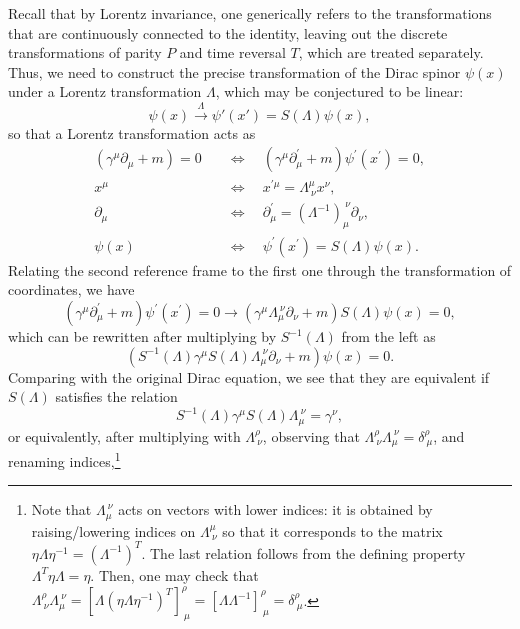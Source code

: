 Recall that by Lorentz invariance, one generically refers to the transformations that are continuously connected to the identity, leaving out the discrete transformations of parity \(P\) and time reversal \(T\), which are treated separately. Thus, we need to construct the precise transformation of the Dirac spinor \(\psi(x)\) under a Lorentz transformation \(\Lambda\), which may be conjectured to be linear:
\[
    \psi(x) \xrightarrow{\Lambda} \psi'(x') = S(\Lambda) \psi(x),
\]
so that a Lorentz transformation acts as
\[
    \begin{aligned}
        \left(\gamma^{\mu} \partial_\mu + m \right) = 0 & \quad \iff \quad \left(\gamma^{\mu} \partial_\mu^{\prime} + m \right) \psi^{\prime} (x^{\prime}) = 0, \\
        x^{\mu}                                         & \quad \iff \quad x^{\prime \mu} = \Lambda^{\mu}_{\ \nu} x^{\nu},                                      \\
        \partial_{\mu}                                  & \quad \iff \quad \partial_{\mu}^{\prime} = \left(\Lambda^{-1}\right)_{\mu}^{\ \nu} \partial_{\nu},    \\
        \psi(x)                                         & \quad \iff \quad \psi^{\prime}(x^{\prime}) = S(\Lambda) \psi(x).
    \end{aligned}
\]
Relating the second reference frame to the first one through the transformation of coordinates, we have
\[
    \left(\gamma^{\mu} \partial_\mu^{\prime} + m \right) \psi^{\prime} (x^{\prime}) = 0 \longrightarrow \left(\gamma^{\mu} \Lambda_{\mu}^{\ \nu} \partial_\nu + m \right) S(\Lambda) \psi(x) = 0,
\]
which can be rewritten after multiplying by \(S^{-1}(\Lambda)\) from the left as
\[
    \left( S^{-1}(\Lambda) \gamma^{\mu} S(\Lambda) \Lambda_{\mu}^{\ \nu} \partial_\nu + m \right) \psi(x) = 0.
\]
Comparing with the original Dirac equation, we see that they are equivalent if \(S(\Lambda)\) satisfies the relation
\[
    S^{-1}(\Lambda) \gamma^{\mu} S(\Lambda) \Lambda_{\mu}^{\ \nu} = \gamma^{\nu},
\]
or equivalently, after multiplying with \(\Lambda^{\rho}_{\ \nu}\), observing that \(\Lambda^{\rho}_{\ \nu} \Lambda_{\mu}^{\ \nu} = \delta^\rho_{\ \mu}\), and renaming indices,\footnote{Note that \(\Lambda_\mu^{\ \nu}\) acts on vectors with lower indices: it is obtained by raising/lowering indices on \(\Lambda^{\mu}_{\ \nu}\) so that it corresponds to the matrix \(\eta \Lambda \eta^{-1} = (\Lambda^{-1})^T\). The last relation follows from the defining property \(\Lambda^T \eta \Lambda = \eta\). Then, one may check that \(\Lambda^{\rho}_{\ \nu} \Lambda_{\mu}^{\ \nu} = \left[\Lambda (\eta \Lambda \eta^{-1})^T\right]^{\rho}_{\ \mu} = \left[\Lambda \Lambda^{-1}\right]^{\rho}_{\ \mu} = \delta^{\rho}_{\ \mu}\).}
